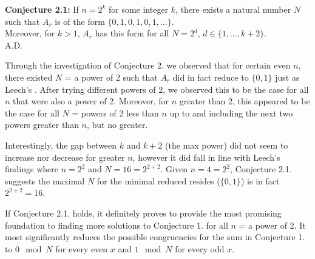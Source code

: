 \documentclass{article}
\begin{document}
\begin{flushleft}
\vspace{.1in}

{\bf Conjecture 2.1:} If $n=2^k$ for some integer $k$, there exists a natural number $N$ such that $A_r$ is of the form $\{0,1,0,1,0,1,...\}$. \\
Moreover, for $k>1$, $A_r$ has this form for all $N=2^d$, $d\in\{1,...,k+2\}$. \\
    \hspace{4.3in} A.D.

    Through the investigation of Conjecture 2. we observed that for certain even $n$, there existed $N$ = a power of 2 such that $A_r$ did in fact reduce to $\{0,1\}$ just as Leech's \cite{leech}. After trying different powers of 2, we observed this to be the case for all $n$ that were also a power of 2. Moreover, for $n$ greater than 2, this appeared to be the case for all $N$ = powers of 2 less than $n$ up to and including the next two powers greater than $n$, but no greater. 
    
    \vspace{.1in}
    
    Interestingly, the gap between $k$ and $k+2$ (the max power) did not seem to increase nor decrease for greater $n$, however it did fall in line with Leech's \cite{leech} findings where $n=2^2$ and $N=16=2^{2+2}$. Given $n=4=2^2$, Conjecture 2.1. suggests the maximal $N$ for the minimal reduced resides ($\{0,1\}$) is in fact $2^{2+2}=16$.

    \vspace{.1in}

    If Conjecture 2.1. holds, it definitely proves to provide the most promising foundation to finding more solutions to Conjecture 1. for all $n$ = a power of 2. It most significantly reduces the possible congruencies for the sum in Conjecture 1. to $0\mod N$ for every even $x$ and $1\mod N$ for every odd $x$.

    \vspace{.1in}
    

\end{flushleft}
\end{document}
